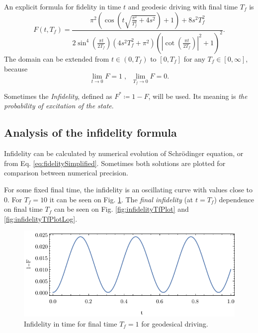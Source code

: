  An explicit formula for fidelity in time $t$ and geodesic driving with final time $T_f$ is
\begin{equation}
    F(t,T_f)=\frac{\pi ^2 \left(\cos \left(t \sqrt{\frac{\pi ^2}{T_f^2}+4 s^2}\right)+1\right)+8 s^2 T_f^2}{2 \sin ^4\left(\frac{\pi  t}{2 T_f}\right) \left(4 s^2 T_f^2+\pi ^2\right) \left(\left| \cot \left(\frac{\pi  t}{2 T_f}\right)\right|^2+1\right)^2}.
    \label{eq:fidelitySimplified}
\end{equation}
The domain can be extended from $t\in(0,T_f)$ to $[0,T_f]$ for any $T_f\in[0,\infty]$, because 
$$
    \lim_{t\rightarrow 0}F=1\; ,\;\; \lim_{T_f\rightarrow 0}F=0.
$$

Sometimes the \emph{Infidelity}, defined as $F^*\coloneqq 1-F$, will be used. Its meaning is \emph{the probability of excitation of the state}.


\subsection{Analysis of the infidelity formula}
Infidelity can be calculated by numerical evolution of Schr\"odinger equation, or from Eq. \ref{eq:fidelitySimplified}. Sometimes both solutions are plotted for comparison between numerical precision. 

For some fixed final time, the infidelity is an oscillating curve with values close to $0$. For $T_f=10$ it can be seen on Fig. \ref{fig:infidelityTimePlot}. The \emph{final infidelity} (at $t=T_f$) dependence on final time $T_f$ can be seen on Fig. \ref{fig:infidelityTfPlot} and \ref{fig:infidelityTfPlotLog}.
\begin{figure}[H]
    \centering
    \includegraphics[scale=1.2]{../img/infidelityTimePlotGeod.pdf}
    \caption{Infidelity in time for final time $T_f=1$ for geodesical driving.}
  \label{fig:infidelityTimePlot}
\end{figure}

